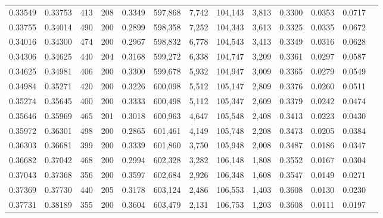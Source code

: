 \begin{tabular}{rrrrrrrrrrrrr}
0.33549 & 0.33753 &   413 & 208 &                                     0.3349 & 597,868 &   7,742 & 104,143 &   3,813 & 0.3300 & 0.0353 & 0.0717 \\
0.33755 & 0.34014 &   490 & 200 &                                     0.2899 & 598,358 &   7,252 & 104,343 &   3,613 & 0.3325 & 0.0335 & 0.0672 \\
0.34016 & 0.34300 &   474 & 200 &                                     0.2967 & 598,832 &   6,778 & 104,543 &   3,413 & 0.3349 & 0.0316 & 0.0628 \\
0.34306 & 0.34625 &   440 & 204 &                                     0.3168 & 599,272 &   6,338 & 104,747 &   3,209 & 0.3361 & 0.0297 & 0.0587 \\
0.34625 & 0.34981 &   406 & 200 &                                     0.3300 & 599,678 &   5,932 & 104,947 &   3,009 & 0.3365 & 0.0279 & 0.0549 \\
0.34984 & 0.35271 &   420 & 200 &                                     0.3226 & 600,098 &   5,512 & 105,147 &   2,809 & 0.3376 & 0.0260 & 0.0511 \\
0.35274 & 0.35645 &   400 & 200 &                                     0.3333 & 600,498 &   5,112 & 105,347 &   2,609 & 0.3379 & 0.0242 & 0.0474 \\
0.35646 & 0.35969 &   465 & 201 &                                     0.3018 & 600,963 &   4,647 & 105,548 &   2,408 & 0.3413 & 0.0223 & 0.0430 \\
0.35972 & 0.36301 &   498 & 200 &                                     0.2865 & 601,461 &   4,149 & 105,748 &   2,208 & 0.3473 & 0.0205 & 0.0384 \\
0.36303 & 0.36681 &   399 & 200 &                                     0.3339 & 601,860 &   3,750 & 105,948 &   2,008 & 0.3487 & 0.0186 & 0.0347 \\
0.36682 & 0.37042 &   468 & 200 &                                     0.2994 & 602,328 &   3,282 & 106,148 &   1,808 & 0.3552 & 0.0167 & 0.0304 \\
0.37043 & 0.37368 &   356 & 200 &                                     0.3597 & 602,684 &   2,926 & 106,348 &   1,608 & 0.3547 & 0.0149 & 0.0271 \\
0.37369 & 0.37730 &   440 & 205 &                                     0.3178 & 603,124 &   2,486 & 106,553 &   1,403 & 0.3608 & 0.0130 & 0.0230 \\
0.37731 & 0.38189 &   355 & 200 &                                     0.3604 & 603,479 &   2,131 & 106,753 &   1,203 & 0.3608 & 0.0111 & 0.0197 \\

\end{tabular}
